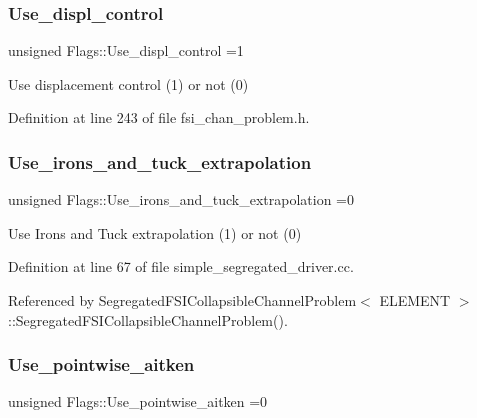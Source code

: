 \mbox{\label{namespaceFlags_adf4a2f4076156f633f45155a2d9f67a0}} 
\subsubsection{\texorpdfstring{Use\+\_\+displ\+\_\+control}{Use\_displ\_control}}
{\footnotesize\ttfamily unsigned Flags\+::\+Use\+\_\+displ\+\_\+control =1}



Use displacement control (1) or not (0) 



Definition at line 243 of file fsi\+\_\+chan\+\_\+problem.\+h.

\mbox{\label{namespaceFlags_a9d92a2ec6ebd4e2ea66605c063e53915}} 
\subsubsection{\texorpdfstring{Use\+\_\+irons\+\_\+and\+\_\+tuck\+\_\+extrapolation}{Use\_irons\_and\_tuck\_extrapolation}}
{\footnotesize\ttfamily unsigned Flags\+::\+Use\+\_\+irons\+\_\+and\+\_\+tuck\+\_\+extrapolation =0}



Use Irons and Tuck extrapolation (1) or not (0) 



Definition at line 67 of file simple\+\_\+segregated\+\_\+driver.\+cc.



Referenced by Segregated\+F\+S\+I\+Collapsible\+Channel\+Problem$<$ E\+L\+E\+M\+E\+N\+T $>$\+::\+Segregated\+F\+S\+I\+Collapsible\+Channel\+Problem().

\mbox{\label{namespaceFlags_aabfbfdb3e91e4df3fc2ec6e2a2e3567d}} 
\subsubsection{\texorpdfstring{Use\+\_\+pointwise\+\_\+aitken}{Use\_pointwise\_aitken}}
{\footnotesize\ttfamily unsigned Flags\+::\+Use\+\_\+pointwise\+\_\+aitken =0}



